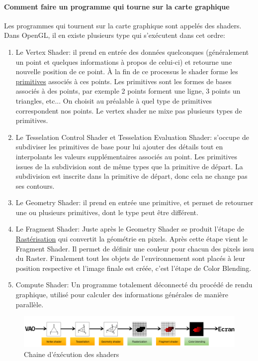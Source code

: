 \documentclass[a4paper,10pt]{report}
\begin{document}
\paragraph{Comment faire un programme qui tourne sur la carte graphique}
Les programmes qui tournent sur la carte graphique sont appelés des shaders. Dans OpenGL, il en existe plusieurs type qui s'exécutent dans cet ordre:
\begin{enumerate}
 \item Le Vertex Shader: il prend en entrée des données quelconques (généralement un point et quelques informations à propos de celui-ci) et retourne une nouvelle position de ce point. À la fin de ce processus le shader forme les \hyperref[subsubsec:Primitives]{primitives} associés à ces points. Les primitives sont les formes de bases associés à des points, par exemple 2 points forment une ligne, 3 points un triangles, etc... On choisit au préalable à quel type de primitives correspondent nos points. Le vertex shader ne mixe pas plusieurs types de primitives.
 \item Le Tesselation Control Shader et Tesselation Evaluation Shader: s'occupe de subdiviser les primitives de base pour lui ajouter des détails tout en interpolants les valeurs supplémentaires associés au point. Les primitives issues de la subdivision sont de même types que la primitive de départ. La subdivision est inscrite dans la primitive de départ, donc cela ne change pas ses contours.
 \item Le Geometry Shader: il prend en entrée une primitive, et permet de retourner une ou plusieurs primitives, dont le type peut être différent.
 \item Le Fragment Shader: Juste après le Geometry Shader se produit l'étape de \href{https://fr.wikipedia.org/wiki/Rast\%C3\%A9risation}{Rastérisation} qui convertit la géométrie en pixels. Après cette étape vient le Fragment Shader. Il permet de définir une couleur pour chacun des pixels issu du Raster. Finalement tout les objets de l'environnement sont placés à leur position respective et l'image finale est créée, c'est l'étape de Color Blending.
 \item Compute Shader: Un programme totalement déconnecté du procédé de rendu graphique, utilisé pour calculer des informations générales de manière parallèle.
\end{enumerate}


\begin{figure}[h]
    \centering
    \includegraphics[width=1\textwidth]{shader_pipeline_sideways}
    \caption{Chaine d'éxécution des shaders}
\end{figure}
\end{document}
